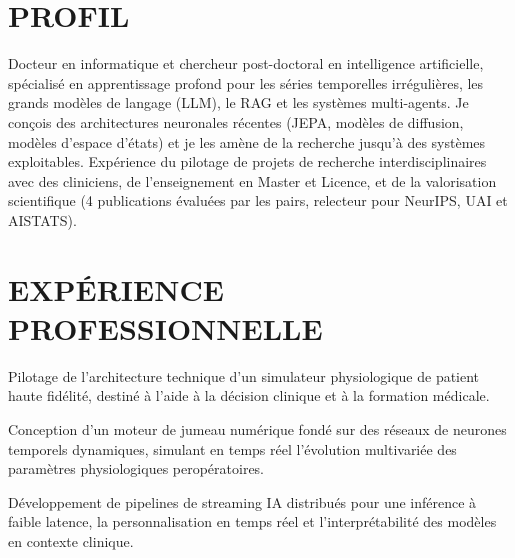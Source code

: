 \section{PROFIL}
{\small Docteur en informatique et chercheur post-doctoral en intelligence artificielle, spécialisé en apprentissage profond pour les séries temporelles irrégulières, les grands modèles de langage (LLM), le RAG et les systèmes multi-agents. Je conçois des architectures neuronales récentes (JEPA, modèles de diffusion, modèles d’espace d’états) et je les amène de la recherche jusqu’à des systèmes exploitables. Expérience du pilotage de projets de recherche interdisciplinaires avec des cliniciens, de l’enseignement en Master et Licence, et de la valorisation scientifique (4 publications évaluées par les pairs, relecteur pour NeurIPS, UAI et AISTATS).}

\section{EXPÉRIENCE PROFESSIONNELLE}
\begin{cvitems}
  \item Pilotage de l’architecture technique d’un simulateur physiologique de patient haute fidélité, destiné à l’aide à la décision clinique et à la formation médicale.
  \item Conception d’un moteur de jumeau numérique fondé sur des réseaux de neurones temporels dynamiques, simulant en temps réel l’évolution multivariée des paramètres physiologiques peropératoires.
  \item Développement de pipelines de streaming IA distribués pour une inférence à faible latence, la personnalisation en temps réel et l’interprétabilité des modèles en contexte clinique.
\end{cvitems}

